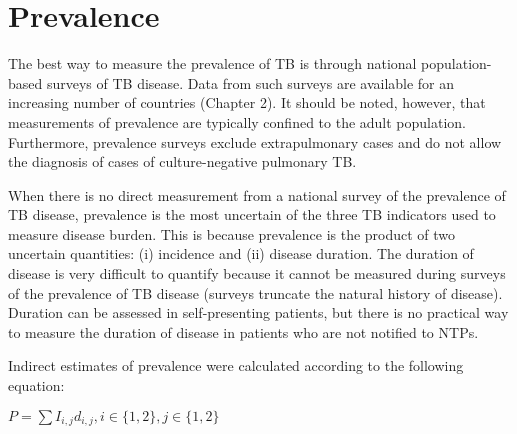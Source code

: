 \section{Prevalence}

The best way to measure the prevalence of TB is through national population-based surveys of TB disease\cite{18713496}\cite{WHO2011}. Data from such surveys are available for an increasing number of countries (Chapter 2). It should be noted, however, that measurements of prevalence are typically confined to the adult population. Furthermore, prevalence surveys exclude extrapulmonary cases and do not allow the diagnosis of cases of culture-negative pulmonary TB. 

When there is no direct measurement from a national survey of the prevalence of TB disease, prevalence is the most uncertain of the three TB indicators used to measure disease burden. This is because prevalence is the product of two uncertain quantities: (i) incidence and (ii) disease duration. The duration of disease is very difficult to quantify because it cannot be measured during surveys of the prevalence of TB disease (surveys truncate the natural history of disease). Duration can be assessed in self-presenting patients, but there is no practical way to measure the duration of disease in patients who are not notified to NTPs.

Indirect estimates of prevalence were calculated according to the following equation:

$P = \sum I_{i,j} d_{i,j}, i \in \lbrace 1, 2\rbrace, j \in \lbrace 1, 2\rbrace$


  